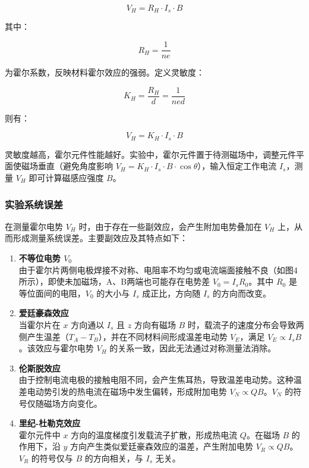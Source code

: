 \documentclass[zihao=5, UTF8]{article}
\theoremstyle{MyLineTheoremStyle} %
\theoremstyle{MyBlockTheoremStyle} %
\theoremstyle{MySubsubsectionStyle} %
\begin{document}
\[
V_H = R_H \cdot I_s \cdot B
\]

其中：

\[
R_H = \frac{1}{ne}
\]

为霍尔系数，反映材料霍尔效应的强弱。定义灵敏度：

\[
K_H = \frac{R_H}{d} = \frac{1}{ned}
\]

则有：

\[
V_H = K_H \cdot I_s \cdot B
\]

灵敏度越高，霍尔元件性能越好。实验中，霍尔元件置于待测磁场中，调整元件平面使磁场垂直（避免角度影响 $V_H = K_H \cdot I_s \cdot B \cdot \cos \theta$），输入恒定工作电流 $I_s$，测量 $V_H$ 即可计算磁感应强度 $B$。

\subsubsection{实验系统误差}

在测量霍尔电势 \( V_H \) 时，由于存在一些副效应，会产生附加电势叠加在 \( V_H \) 上，从而形成测量系统误差。主要副效应及其特点如下：

\begin{enumerate}
    \item \textbf{不等位电势 \( V_0 \)} \\
    由于霍尔片两侧电极焊接不对称、电阻率不均匀或电流端面接触不良（如图4所示），即使未加磁场，A、B两端也可能存在电势差 \( V_0 = I_s R_0 \)。其中 \( R_0 \) 是等位面间的电阻，\( V_0 \) 的大小与 \( I_s \) 成正比，方向随 \( I_s \) 的方向而改变。

    \item \textbf{爱廷豪森效应} \\
    当霍尔片在 \( x \) 方向通以 \( I_s \) 且 \( z \) 方向有磁场 \( B \) 时，载流子的速度分布会导致两侧产生温差（\( T_A - T_B \)），并在不同材料间形成温差电动势 \( V_E \)，满足 \( V_E \propto I_s B \)。该效应与霍尔电势 \( V_H \) 的关系一致，因此无法通过对称测量法消除。

    \item \textbf{伦斯脱效应} \\
    由于控制电流电极的接触电阻不同，会产生焦耳热，导致温差电动势。这种温差电动势引发的热电流在磁场中发生偏转，形成附加电势 \( V_N \propto Q B \)。\( V_N \) 的符号仅随磁场方向变化。

    \item \textbf{里纪-杜勒克效应} \\
    霍尔元件中 \( x \) 方向的温度梯度引发载流子扩散，形成热电流 \( Q \)。在磁场 \( B \) 的作用下，沿 \( y \) 方向产生类似爱廷豪森效应的温差，产生附加电势 \( V_R \propto Q B \)。\( V_R \) 的符号仅与 \( B \) 的方向相关，与 \( I_s \) 无关。
\end{enumerate}
\end{document}
